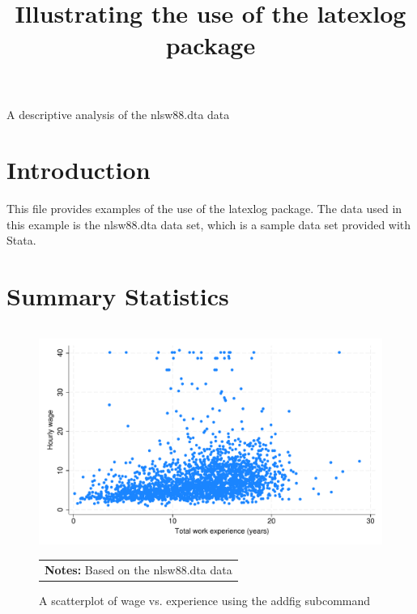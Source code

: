 \documentclass{article}
\begin{document}
\title{Illustrating the use of the latexlog package}
\maketitle
A descriptive analysis of the nlsw88.dta data
\section{Introduction}
This file provides examples of the use of the latexlog package.
The data used in this example is the nlsw88.dta data set, which is a sample data set provided with Stata.
\section{Summary Statistics}
\begin{figure}[H] 
\centering 
\begin{tabular}{p{6in}}
\caption{A scatterplot of wage vs. experience using the addfig subcommand} 
\end{tabular}
\includegraphics[width = .8\textwidth]{./figures/scatter_wage.pdf} \\ 
\begin{tabular}{p{6in}}  
\footnotesize \vspace{2pt} 
  \textbf{Notes:} Based on the nlsw88.dta data 
\end{tabular} 
\end{figure} 
\end{document}
